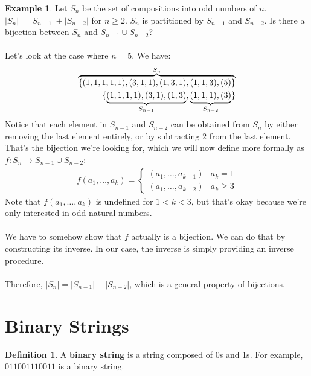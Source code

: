 \documentclass[]{article}
\theoremstyle{definition}
\newtheorem*{defn}{Definition}
\newtheorem{ex}{Example}[section]
\newcommand{\lecture}[1]{\marginpar{{\footnotesize $\leftarrow$ \underline{#1}}}}
\DeclarePairedDelimiter{\set}{\lbrace}{\rbrace}
\begin{document}
				\begin{ex}
					Let $S_n$ be the set of compositions into odd numbers of $n$. $|S_n| = |S_{n - 1}| + |S_{n - 2}|$ for $n \ge 2$. $S_n$ is partitioned by $S_{n - 1}$ and $S_{n - 2}$. Is there a bijection between $S_n$ and $S_{n - 1} \cup S_{n - 2}$?
					\\ \\
					Let's look at the case where $n = 5$. We have: \lecture{January 25, 2013}
					\begin{align*}
						\overbrace{\set{(1, 1, 1, 1, 1), (3, 1, 1), (1, 3, 1), (1, 1, 3), (5) }}^{S_n} \\
						\set{\underbrace{(1, 1, 1, 1), (3, 1), (1, 3)}_{S_{n - 1}}, \underbrace{(1, 1, 1), (3)}_{S_{n - 2}} }
					\end{align*}
					Notice that each element in $S_{n - 1}$ and $S_{n - 2}$ can be obtained from $S_n$ by either removing the last element entirely, or by subtracting 2 from the last element. That's the bijection we're looking for, which we will now define more formally as $f : S_n \to S_{n - 1} \cup S_{n - 2}$:
					\begin{align*}
						f(a_1, \ldots, a_k) = \begin{cases}
							(a_1, \ldots, a_{k - 1}) & a_k = 1 \\
							(a_1, \ldots, a_{k - 2}) & a_k \ge 3
						\end{cases}
					\end{align*}
					Note that $f(a_1, \ldots, a_k)$ is undefined for $1 < k < 3$, but that's okay because we're only interested in odd natural numbers.
					\\ \\
					We have to somehow show that $f$ actually is a bijection. We can do that by constructing its inverse. In our case, the inverse is simply providing an inverse procedure.
					\\ \\
					Therefore, $|S_n| = |S_{n - 1}| + |S_{n - 2}|$, which is a general property of bijections.
				\end{ex}

	\section{Binary Strings}
		\begin{defn}
		A \textbf{binary string} is a string composed of 0s and 1s. For example, $011001110011$ is a binary string.
		\end{defn}
\end{document}

